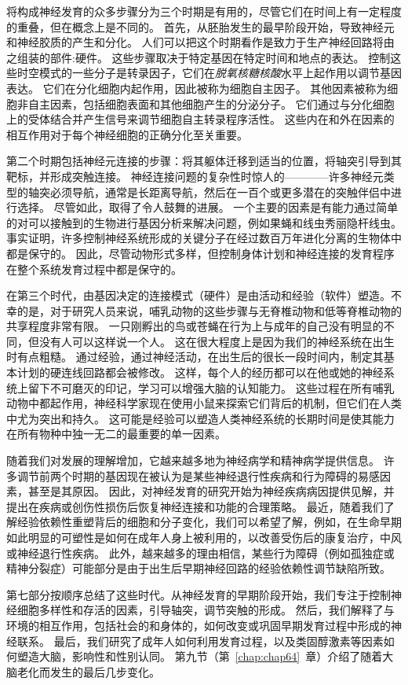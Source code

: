 将构成神经发育的众多步骤分为三个时期是有用的，尽管它们在时间上有一定程度的重叠，但在概念上是不同的。
首先，从胚胎发生的最早阶段开始，导致神经元和神经胶质的产生和分化。
人们可以把这个时期看作是致力于生产神经回路将由之组装的部件:硬件。
这些步骤取决于特定基因在特定时间和地点的表达。
控制这些时空模式的一些分子是转录因子，它们在\textit{脱氧核糖核酸}水平上起作用以调节基因表达。
它们在分化细胞内起作用，因此被称为细胞自主因子。
其他因素被称为细胞非自主因素，包括细胞表面和其他细胞产生的分泌分子。
它们通过与分化细胞上的受体结合并产生信号来调节细胞自主转录程序活性。
这些内在和外在因素的相互作用对于每个神经细胞的正确分化至关重要。


第二个时期包括神经元连接的步骤：将其躯体迁移到适当的位置，将轴突引导到其靶标，并形成突触连接。
神经连接问题的复杂性时惊人的————许多神经元类型的轴突必须导航，通常是长距离导航，然后在一百个或更多潜在的突触伴侣中进行选择。
尽管如此，取得了令人鼓舞的进展。
一个主要的因素是有能力通过简单的对可以接触到的生物进行基因分析来解决问题，例如果蝇和线虫秀丽隐杆线虫。
事实证明，许多控制神经系统形成的关键分子在经过数百万年进化分离的生物体中都是保守的。
因此，尽管动物形式多样，但控制身体计划和神经连接的发育程序在整个系统发育过程中都是保守的。


在第三个时代，由基因决定的连接模式（硬件）是由活动和经验（软件）塑造。不幸的是，对于研究人员来说，哺乳动物的这些步骤与无脊椎动物和低等脊椎动物的共享程度非常有限。
一只刚孵出的鸟或苍蝇在行为上与成年的自己没有明显的不同，但没有人可以这样说一个人。
这在很大程度上是因为我们的神经系统在出生时有点粗糙。
通过经验，通过神经活动，在出生后的很长一段时间内，制定其基本计划的硬连线回路都会被修改。
这样，每个人的经历都可以在他或她的神经系统上留下不可磨灭的印记，学习可以增强大脑的认知能力。
这些过程在所有哺乳动物中都起作用，神经科学家现在使用小鼠来探索它们背后的机制，但它们在人类中尤为突出和持久。
这可能是经验可以塑造人类神经系统的长期时间是使其能力在所有物种中独一无二的最重要的单一因素。


随着我们对发展的理解增加，它越来越多地为神经病学和精神病学提供信息。
许多调节前两个时期的基因现在被认为是某些神经退行性疾病和行为障碍的易感因素，甚至是其原因。
因此，对神经发育的研究开始为神经疾病病因提供见解，并提出在疾病或创伤性损伤后恢复神经连接和功能的合理策略。
最近，随着我们了解经验依赖性重塑背后的细胞和分子变化，我们可以希望了解，例如，在生命早期如此明显的可塑性是如何在成年人身上被利用的，以改善受伤后的康复治疗，中风或神经退行性疾病。
此外，越来越多的理由相信，某些行为障碍（例如孤独症或精神分裂症）可能部分是由于出生后早期神经回路的经验依赖性调节缺陷所致。


第七部分按顺序总结了这些时代。从神经发育的早期阶段开始，我们专注于控制神经细胞多样性和存活的因素，引导轴突，调节突触的形成。
然后，我们解释了与环境的相互作用，包括社会的和身体的，如何改变或巩固早期发育过程中形成的神经联系。
最后，我们研究了成年人如何利用发育过程，以及类固醇激素等因素如何塑造大脑，影响性和性别认同。
第九节（第~\ref{chap:chap64}~章）介绍了随着大脑老化而发生的最后几步变化。



